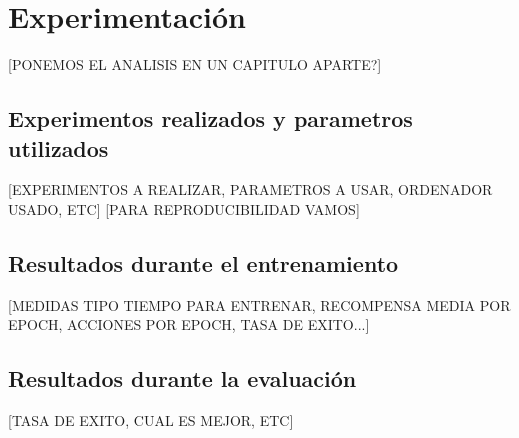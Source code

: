 \chapter{Experimentación}

[PONEMOS EL ANALISIS EN UN CAPITULO APARTE?]

\section{Experimentos realizados y parametros utilizados}
[EXPERIMENTOS A REALIZAR, PARAMETROS A USAR, ORDENADOR USADO, ETC]
[PARA REPRODUCIBILIDAD VAMOS]

\section{Resultados durante el entrenamiento}
[MEDIDAS TIPO TIEMPO PARA ENTRENAR, RECOMPENSA MEDIA POR EPOCH, ACCIONES POR EPOCH, TASA DE EXITO...]


\section{Resultados durante la evaluación}
[TASA DE EXITO, CUAL ES MEJOR, ETC]
